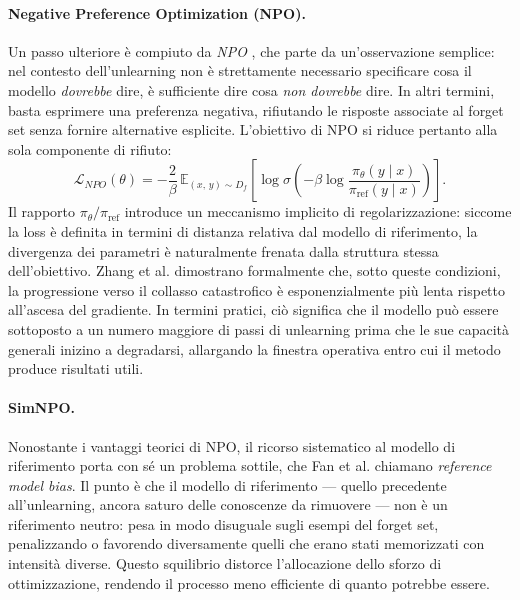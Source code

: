 \paragraph{Negative Preference Optimization (NPO).}
Un passo ulteriore è compiuto da \emph{NPO} \cite{zhang_negative_2024}, che parte da un'osservazione semplice: nel contesto dell'unlearning non è strettamente necessario specificare cosa il modello \emph{dovrebbe} dire, è sufficiente dire cosa \emph{non dovrebbe} dire. In altri termini, basta esprimere una preferenza negativa, rifiutando le risposte associate al forget set senza fornire alternative esplicite. L'obiettivo di NPO si riduce pertanto alla sola componente di rifiuto:
\begin{equation}
    \mathcal{L}_{NPO}(\theta) = -\frac{2}{\beta}\,\mathbb{E}_{(x,\,y) \sim D_f}\!\left[\log \sigma\!\left(-\beta \log \frac{\pi_\theta(y \mid x)}{\pi_{\mathrm{ref}}(y \mid x)}\right)\right].
    \label{eq:npo}
\end{equation}
Il rapporto $\pi_\theta / \pi_{\mathrm{ref}}$ introduce un meccanismo implicito di regolarizzazione: siccome la loss è definita in termini di distanza relativa dal modello di riferimento, la divergenza dei parametri è naturalmente frenata dalla struttura stessa dell'obiettivo. Zhang et al. \cite{zhang_negative_2024} dimostrano formalmente che, sotto queste condizioni, la progressione verso il collasso catastrofico è esponenzialmente più lenta rispetto all'ascesa del gradiente. In termini pratici, ciò significa che il modello può essere sottoposto a un numero maggiore di passi di unlearning prima che le sue capacità generali inizino a degradarsi, allargando la finestra operativa entro cui il metodo produce risultati utili.

\paragraph{SimNPO.}
Nonostante i vantaggi teorici di NPO, il ricorso sistematico al modello di riferimento porta con sé un problema sottile, che Fan et al. \cite{fan_simplicity_2024} chiamano \emph{reference model bias}. Il punto è che il modello di riferimento — quello precedente all'unlearning, ancora saturo delle conoscenze da rimuovere — non è un riferimento neutro: pesa in modo disuguale sugli esempi del forget set, penalizzando o favorendo diversamente quelli che erano stati memorizzati con intensità diverse. Questo squilibrio distorce l'allocazione dello sforzo di ottimizzazione, rendendo il processo meno efficiente di quanto potrebbe essere.

